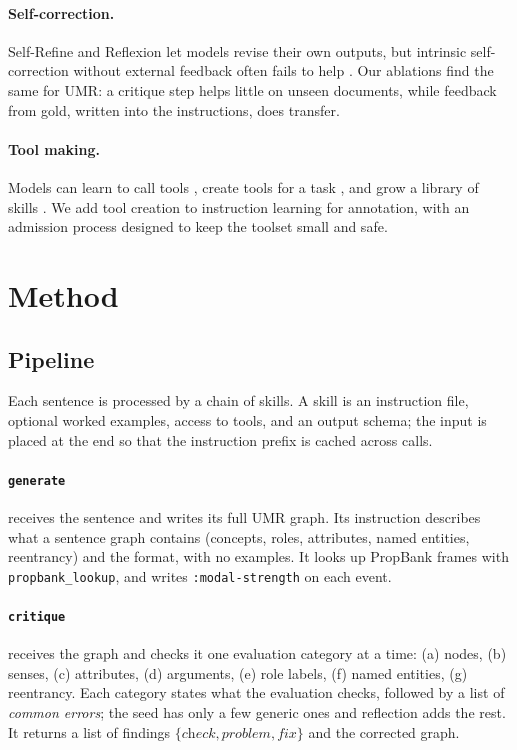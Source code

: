 \documentclass[11pt]{article}
\newcommand{\umr}{\textsc{UMR}\xspace}
\newcommand{\skill}[1]{\texttt{#1}}
\begin{document}
\paragraph{Self-correction.}
Self-Refine \citep{madaan2023selfrefine} and Reflexion \citep{shinn2023reflexion} let models revise their own outputs, but intrinsic self-correction without external feedback often fails to help \citep{huang2024cannot}. Our ablations find the same for \umr: a critique step helps little on unseen documents, while feedback from gold, written into the instructions, does transfer.

\paragraph{Tool making.}
Models can learn to call tools \citep{schick2023toolformer}, create tools for a task \citep{cai2024latm,qian2023creator}, and grow a library of skills \citep{wang2023voyager}. We add tool creation to instruction learning for annotation, with an admission process designed to keep the toolset small and safe.

\section{Method}

\subsection{Pipeline}

Each sentence is processed by a chain of skills. A skill is an instruction file, optional worked examples, access to tools, and an output schema; the input is placed at the end so that the instruction prefix is cached across calls.

\paragraph{\skill{generate}} receives the sentence and writes its full \umr graph. Its instruction describes what a sentence graph contains (concepts, roles, attributes, named entities, reentrancy) and the format, with no examples. It looks up PropBank frames with \texttt{propbank\_lookup}, and writes \texttt{:modal-strength} on each event.

\paragraph{\skill{critique}} receives the graph and checks it one evaluation category at a time: (a) nodes, (b) senses, (c) attributes, (d) arguments, (e) role labels, (f) named entities, (g) reentrancy. Each category states what the evaluation checks, followed by a list of \emph{common errors}; the seed has only a few generic ones and reflection adds the rest. It returns a list of findings \(\{\textit{check},\textit{problem},\textit{fix}\}\) and the corrected graph.
\end{document}
